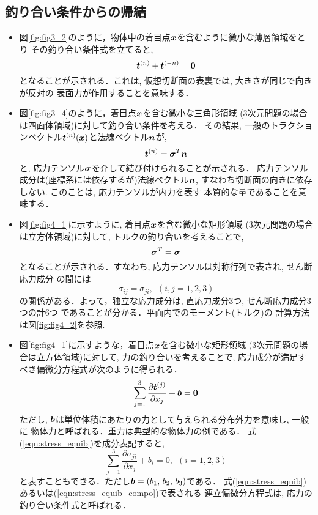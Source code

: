 \documentclass[10pt,a4j]{jarticle}
\begin{document}
\subsection{釣り合い条件からの帰結}\label{equib}
\begin{itemize}
\item
	図\ref{fig:fig3_2}のように，物体中の着目点$\mbox{\boldmath $x$}$を含むように微小な薄層領域をとり
	その釣り合い条件式を立てると, 
	\begin{equation}
		\mbox{\boldmath $t$}^{(n)}+\mbox{\boldmath $t$}^{(-n)}=\mbox{\boldmath $0$}
		\label{eqn:t_pmn}
	\end{equation}
	となることが示される．これは, 仮想切断面の表裏では, 大きさが同じで向きが反対の
	表面力が作用することを意味する．
\item
	図\ref{fig:fig3_4}のように，着目点$\mbox{\boldmath $x$}$を含む微小な三角形領域
	(3次元問題の場合は四面体領域)に対して釣り合い条件を考える．
	その結果, 一般のトラクションベクトル$\mbox{\boldmath $t$}^{(n)}(\mbox{\boldmath $x$})$と法線ベクトル$\mbox{\boldmath $n$}$が, 
	\begin{equation}
		\mbox{\boldmath $t$}^{(n)}=\mbox{\boldmath $\sigma$}^{T}\mbox{\boldmath $n$}
		\label{eqn:t_as_sign}
	\end{equation}
	と, 応力テンソル$\mbox{\boldmath $\sigma$}$を介して結び付けられることが示される．
	応力テンソル成分は(座標系には依存するが)法線ベクトル$\mbox{\boldmath $n$}$, 
	すなわち切断面の向きに依存しない. このことは, 応力テンソルが内力を表す
	本質的な量であることを意味する．
\item
	図\ref{fig:fig4_1}に示すように, 着目点$\mbox{\boldmath $x$}$を含む微小な矩形領域
	(3次元問題の場合は立方体領域)に対して, トルクの釣り合いを考えることで, 
	\begin{equation}
		\mbox{\boldmath $\sigma$}^{T}=\mbox{\boldmath $\sigma$}
		\label{eqn:sig_sym}
	\end{equation}
	となることが示される．すなわち, 応力テンソルは対称行列で表され, せん断応力成分
	の間には
	\begin{equation}
		\sigma_{ij}=\sigma_{ji}, \ \ (i,j=1,2,3)
		\label{eqn:sig_sym_comp}
	\end{equation}
	の関係がある．よって，独立な応力成分は, 直応力成分3つ, せん断応力成分3つの計6つ
	であることが分かる．平面内でのモーメント(トルク)の
	計算方法は図\ref{fig:fig4_2}を参照.
\item
	図\ref{fig:fig4_1}に示すような，着目点$\mbox{\boldmath $x$}$を含む微小な矩形領域
	(3次元問題の場合は立方体領域)に対して, 力の釣り合いを考えることで, 
	応力成分が満足すべき偏微分方程式が次のように得られる．
	\begin{equation}
		\sum_{j=1}^3 \frac{\partial \mbox{\boldmath $t$}^{(j)}}{\partial x_j}+\mbox{\boldmath $b$}=\mbox{\boldmath $0$}
		\label{eqn:stress_equib}
	\end{equation}
	ただし, $\mbox{\boldmath $b$}$は単位体積にあたりの力として与えられる分布外力を意味し, 一般に
	物体力と呼ばれる．重力は典型的な物体力の例である．
	式(\ref{eqn:stress_equib})を成分表記すると, 
	\begin{equation}
		\sum_{j=1}^3 \frac{\partial \sigma_{ji}}{\partial x_j}+b_i=0, \ \ (i=1,2,3)
		\label{eqn:stress_equib_compo}
	\end{equation}
	と表すこともできる．ただし$\mbox{\boldmath $b$}=(b_1,\,b_2,\, b_3)$である．
	式(\ref{eqn:stress_equib})あるいは(\ref{eqn:stress_equib_compo})で表される
	連立偏微分方程式は, 応力の釣り合い条件式と呼ばれる．
\end{itemize}
\end{document}
